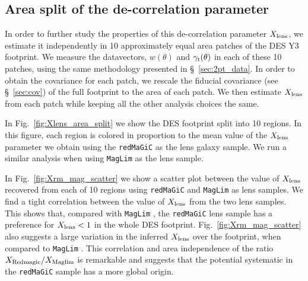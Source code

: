 \documentclass[aps, prd,twocolumn,superscriptaddress,nofootinbib,preprintnumbers]{revtex4-1}
\newcommand{\gammat}{\ensuremath{\gamma_{\rm t}(\theta)}}
\newcommand{\redmagic}{\texttt{redMaGiC} }
\newcommand{\maglim}{\texttt{MagLim} }
\newcommand{\SP}[1]{{\color{red}[SP: #1]}}
\begin{document}
\subsection{Area split of the de-correlation parameter}
In order to further study the properties of this de-correlation parameter $X_{\rm lens}$, we estimate it independently in 10 approximately equal area patches  of the DES Y3 footprint.  We measure the datavectors, $w(\theta)$ and $\gammat$ in each of these 10 patches, using the same methodology presented in \S~\ref{sec:2pt_data}. In order to obtain the covariance for each patch, we rescale the fiducial covariance (see \S~\ref{sec:cov}) of the full footprint to the area of each patch. We then estimate  $X_{\rm lens}$ from each patch while keeping all the other analysis choices the same. 

In Fig.~\ref{fig:Xlens_area_split} we show the DES footprint split into 10 regions. In this figure, each region is colored in proportion to the mean value of the $X_{\rm lens}$ parameter we obtain using the \redmagic as the lens galaxy sample. We run a similar analysis when using \maglim as the lens sample. 


In Fig.~\ref{fig:Xrm_mag_scatter} we show a scatter plot between the value of $X_{\rm lens}$ recovered from each of 10 regions using \redmagic and \maglim as lens samples. We find a tight correlation between the value of $X_{\rm lens}$ from the two lens samples. This shows that, compared with \maglim, the \redmagic lens sample has a preference for $X_{\rm lens} < 1$ in the whole DES footprint. Fig.~\ref{fig:Xrm_mag_scatter} also suggests a large variation  in the inferred $X_{\rm lens}$ over the footprint, when compared to \maglim. This correlation and area independence of the ratio $X_{\rm Redmagic}/X_{\rm Maglim}$ is remarkable and suggests that the potential systematic in the \redmagic sample has a more global origin. 

\end{document}
